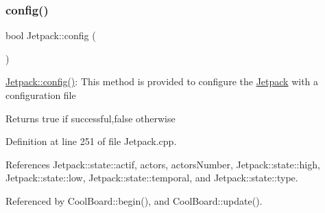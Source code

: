 \subsubsection{\texorpdfstring{config()}{config()}}
{\footnotesize\ttfamily bool Jetpack\+::config (\begin{DoxyParamCaption}{ }\end{DoxyParamCaption})}

\hyperlink{classJetpack_ab065ee83e244265a2223a22f3ee4a719}{Jetpack\+::config()}\+: This method is provided to configure the \hyperlink{classJetpack}{Jetpack} with a configuration file

\begin{DoxyReturn}{Returns}
true if successful,false otherwise 
\end{DoxyReturn}


Definition at line 251 of file Jetpack.\+cpp.



References Jetpack\+::state\+::actif, actors, actors\+Number, Jetpack\+::state\+::high, Jetpack\+::state\+::low, Jetpack\+::state\+::temporal, and Jetpack\+::state\+::type.



Referenced by Cool\+Board\+::begin(), and Cool\+Board\+::update().


